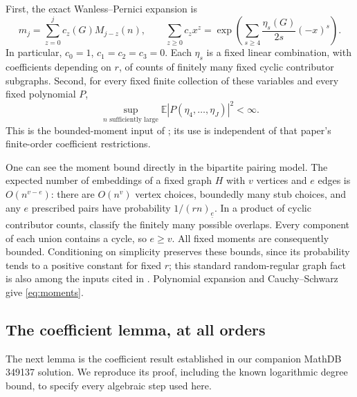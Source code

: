 \documentclass[11pt]{article}
\newcommand{\fall}[2]{(#1)_{\underline{#2}}}
\begin{document}
First, the exact Wanless--Pernici expansion \cite{wanless,pernici} is
\begin{equation}\label{eq:matching}
 m_j=\sum_{z=0}^j c_z(G)M_{j-z}(n),\qquad
 \sum_{z\ge0}c_z x^z
   =\exp\left(\sum_{s\ge4}\frac{\eta_s(G)}{2s}(-x)^s\right).
\end{equation}
In particular, $c_0=1$, $c_1=c_2=c_3=0$. Each $\eta_s$ is a
fixed linear combination, with coefficients depending on $r$, of
counts of finitely many fixed cyclic contributor subgraphs.
Second, for every fixed finite collection of these variables and
every fixed polynomial $P$,
\begin{equation}\label{eq:moments}
 \sup_{n\text{ sufficiently large}}\mathbb E|P(\eta_4,\ldots,\eta_J)|^2
 <\infty.
\end{equation}
This is the bounded-moment input of \cite[equation (3.10)]{graph};
its use is independent of that paper's finite-order coefficient
restrictions.

One can see the moment bound directly in the bipartite pairing
model. The expected number of embeddings of a fixed graph $H$ with
$v$ vertices and $e$ edges is $O(n^{v-e})$: there are $O(n^v)$
vertex choices, boundedly many stub choices, and any $e$ prescribed
pairs have probability $1/\fall{rn}{e}$. In a product of cyclic
contributor counts, classify the finitely many possible overlaps.
Every component of each union contains a cycle, so $e\ge v$.
All fixed moments are consequently bounded. Conditioning on
simplicity preserves these bounds, since its probability tends to
a positive constant for fixed $r$; this standard random-regular
graph fact is also among the inputs cited in \cite{graph}.
Polynomial expansion and Cauchy--Schwarz give \eqref{eq:moments}.

\subsection*{The coefficient lemma, at all orders}
The next lemma is the coefficient result established in our companion
MathDB 349137 solution. We reproduce its proof, including the known
logarithmic degree bound, to specify every algebraic step used here.
\end{document}
